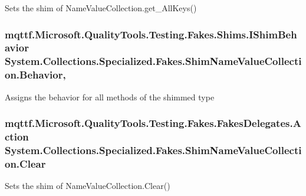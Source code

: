Sets the shim of Name\-Value\-Collection.\-get\-\_\-\-All\-Keys()

\hypertarget{class_system_1_1_collections_1_1_specialized_1_1_fakes_1_1_shim_name_value_collection_a488a2ba323e49b9fc574323385ac5fe7}{
\subsubsection[{Behavior}]{\setlength{\rightskip}{0pt plus 5cm}mqttf.\-Microsoft.\-Quality\-Tools.\-Testing.\-Fakes.\-Shims.\-I\-Shim\-Behavior System.\-Collections.\-Specialized.\-Fakes.\-Shim\-Name\-Value\-Collection.\-Behavior\hspace{0.3cm}{\ttfamily [static]}, {\ttfamily [set]}}}\label{class_system_1_1_collections_1_1_specialized_1_1_fakes_1_1_shim_name_value_collection_a488a2ba323e49b9fc574323385ac5fe7}


Assigns the behavior for all methods of the shimmed type

\hypertarget{class_system_1_1_collections_1_1_specialized_1_1_fakes_1_1_shim_name_value_collection_af81cade875225aed5cca6717264574cb}{
\subsubsection[{Clear}]{\setlength{\rightskip}{0pt plus 5cm}mqttf.\-Microsoft.\-Quality\-Tools.\-Testing.\-Fakes.\-Fakes\-Delegates.\-Action System.\-Collections.\-Specialized.\-Fakes.\-Shim\-Name\-Value\-Collection.\-Clear\hspace{0.3cm}{\ttfamily [set]}}}\label{class_system_1_1_collections_1_1_specialized_1_1_fakes_1_1_shim_name_value_collection_af81cade875225aed5cca6717264574cb}


Sets the shim of Name\-Value\-Collection.\-Clear()

